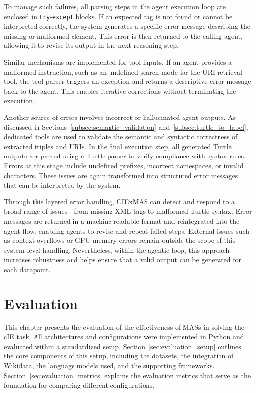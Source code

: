 \documentclass[a4paper,oneside,bibliography=totoc]{scrbook}
\begin{document}
To manage such failures, all parsing steps in the agent execution loop are enclosed in \texttt{try}-\texttt{except} blocks. If an expected tag is not found or cannot be interpreted correctly, the system generates a specific error message describing the missing or malformed element. This error is then returned to the calling agent, allowing it to revise its output in the next reasoning step.

Similar mechanisms are implemented for tool inputs. If an agent provides a malformed instruction, such as an undefined search mode for the URI retrieval tool, the tool parser triggers an exception and returns a descriptive error message back to the agent. This enables iterative corrections without terminating the execution.

Another source of errors involves incorrect or hallucinated agent outputs. As discussed in Sections~\ref{subsec:semantic_validation} and~\ref{subsec:turtle_to_label}, dedicated tools are used to validate the semantic and syntactic correctness of extracted triples and URIs. In the final execution step, all generated Turtle outputs are parsed using a Turtle parser to verify compliance with syntax rules. Errors at this stage include undefined prefixes, incorrect namespaces, or invalid characters. These issues are again transformed into structured error messages that can be interpreted by the system.

Through this layered error handling, CIExMAS can detect and respond to a broad range of issues—from missing XML tags to malformed Turtle syntax. Error messages are returned in a machine-readable format and reintegrated into the agent flow, enabling agents to revise and repeat failed steps. External issues such as context overflows or GPU memory errors remain outside the scope of this system-level handling. Nevertheless, within the agentic loop, this approach increases robustness and helps ensure that a valid output can be generated for each datapoint.

\chapter{Evaluation}
\label{ch:evaluation}

This chapter presents the evaluation of the effectiveness of \acp{MAS} in solving the \ac{cIE} task. All architectures and configurations were implemented in Python and evaluated within a standardized setup. Section~\ref{sec:evaluation_setup} outlines the core components of this setup, including the datasets, the integration of Wikidata, the language models used, and the supporting frameworks. Section~\ref{sec:evaluation_metrics} explains the evaluation metrics that serve as the foundation for comparing different configurations.
\end{document}
